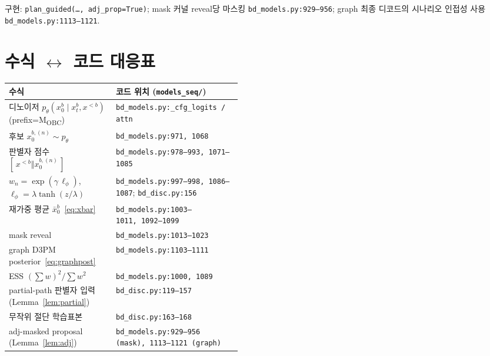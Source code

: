 \documentclass[11pt]{article}
\newcommand{\code}[1]{\texttt{\small #1}}
\newcommand{\xpre}{x^{<b}}        %
\newcommand{\xblk}{x^{b}}         %
\newcommand{\pth}{p_\theta}
\newcommand{\xbar}{\bar{x}}
\theoremstyle{plain}
\theoremstyle{definition}
\begin{document}
\noindent 구현: \code{plan\_guided(\dots, adj\_prop=True)}; mask 커널 reveal당 마스킹
\code{bd\_models.py:929--956}; graph 최종 디코드의 시나리오 인접성 사용
\code{bd\_models.py:1113--1121}.

\section{수식 $\leftrightarrow$ 코드 대응표}
\begin{center}
\renewcommand{\arraystretch}{1.25}
\begin{tabular}{@{}p{0.46\linewidth} l@{}}
\toprule
\textbf{수식} & \textbf{코드 위치 (\code{models\_seq/})}\\
\midrule
디노이저 $\pth(\xblk_0\mid\xblk_t,\xpre)$ (prefix=M\textsubscript{OBC}) & \code{bd\_models.py:\_cfg\_logits / attn} \\
후보 $x^{b,(n)}_0\sim\pth$ & \code{bd\_models.py:971,\ 1068} \\
판별자 점수 $[\,\xpre\Vert x^{b,(n)}_0\,]$ & \code{bd\_models.py:978--993,\ 1071--1085} \\
$w_n=\exp(\gamma\,\ell_\phi)$, $\ell_\phi=\lambda\tanh(z/\lambda)$ & \code{bd\_models.py:997--998,\ 1086--1087}; \code{bd\_disc.py:156} \\
재가중 평균 $\xbar^b_0$~\eqref{eq:xbar} & \code{bd\_models.py:1003--1011,\ 1092--1099} \\
mask reveal & \code{bd\_models.py:1013--1023} \\
graph D3PM posterior~\eqref{eq:graphpost} & \code{bd\_models.py:1103--1111} \\
ESS $(\sum w)^2/\sum w^2$ & \code{bd\_models.py:1000,\ 1089} \\
partial-path 판별자 입력 (Lemma~\ref{lem:partial}) & \code{bd\_disc.py:119--157} \\
무작위 절단 학습표본 & \code{bd\_disc.py:163--168} \\
adj-masked proposal (Lemma~\ref{lem:adj}) & \code{bd\_models.py:929--956 (mask), 1113--1121 (graph)} \\
\bottomrule
\end{tabular}
\end{center}
\end{document}
